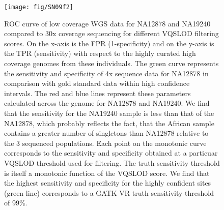 \begin{figure}
\centering
\texttt{[image: fig/SN09f2]}
\caption[\Gls{ROC} curve]{\gls{ROC} curve of low coverage \gls{WGS} data for NA12878 and NA19240 compared to 30x coverage sequencing for different \gls{VQSLOD} filtering scores. On the x-axis is the \gls{FPR} (1-specificity) and on the y-axis is the \gls{TPR} (sensitivity) with respect to the highly curated high coverage genomes from these individuals. The green curve represents the sensitivity and specificity of 4x sequence data for NA12878 in comparison with gold standard data within high confidence intervals. The red and blue lines represent these parameters calculated across the genome for NA12878 and NA19240. We find that the sensitivity for the NA19240 sample is less than that of the NA12878, which probably reflects the fact, that the African sample contains a greater number of singletons than NA12878 relative to the 3 sequenced populations. Each point on the monotonic curve corresponds to the sensitivity and specificity obtained at a particuar VQSLOD threshold used for filtering. The truth sensitivity threshold is itself a monotonic function of the VQSLOD score. We find that the highest sensitivity and specificity for the highly confident sites (green line) corresponds to a GATK \gls{VR} truth sensitivity threshold of 99\%.}
\label{fig:SN09f2}
\end{figure}